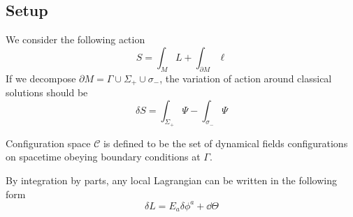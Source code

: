 \documentclass[10pt]{article}
\begin{document}
\subsection{Setup}
We consider the following action
\begin{equation}
    S=\int_M L+\int_{\partial M}\ell\label{eq:action}
\end{equation}
If we decompose $\partial M=\Gamma\cup\Sigma_+\cup\sigma_-$, the variation of action around classical solutions should be
\begin{equation}
    \delta S=\int_{\Sigma_+}\Psi-\int_{\sigma_-}\Psi\label{var_S_1}
\end{equation}
\begin{definition}
    Configuration space $\mathcal{C}$ is defined to be the set of dynamical fields configurations on spacetime obeying boundary conditions at $\Gamma$.
\end{definition}

By integration by parts, any local Lagrangian can be written in the following form
\begin{equation}
    \delta L=E_a\delta \phi^a+\dd{\Theta}
\end{equation}
\end{document}

